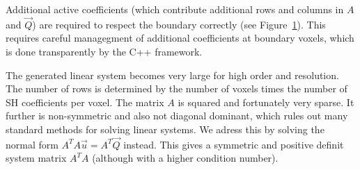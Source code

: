 Additional active coefficients (which contribute additional rows and columns in $A$ and $\vec{Q}$) are required to respect the boundary correctly (see Figure~\ref{fig:staggeredgrid}). This requires careful managegment of additional coefficients at boundary voxels, which is done transparently by the C++ framework.


\begin{figure}[h]
\centering
\begin{subfigure}{0.45\columnwidth}
\end{subfigure}%
\hspace{0.05\columnwidth}
\begin{subfigure}{0.45\columnwidth}
\end{subfigure}%
\label{fig:staggeredgrid}
\end{figure}


The generated linear system becomes very large for high order and resolution. The number of rows is determined by the number of voxels times the number of SH coefficients per voxel. The matrix $A$ is squared and fortunately very sparse. It further is non-symmetric and also not diagonal dominant, which rules out many standard methods for solving linear systems. We adress this by solving the normal form $A^TA\vec{u}=A^T\vec{Q}$ instead. This gives a symmetric and positive definit system matrix $A^TA$ (although with a higher condition number).


